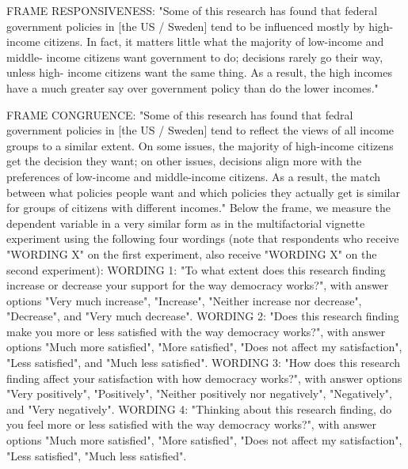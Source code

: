\documentclass[12pt, letterpaper]{article}
\begin{document}
\begin{spacing}{1.5}
FRAME RESPONSIVENESS: "Some of this research has found that federal government policies in [the US / Sweden] tend to be influenced mostly by high- income citizens. In fact, it matters little what the majority of low-income and middle- income citizens want government to do; decisions rarely go their way, unless high- income citizens want the same thing. As a result, the high incomes have a much greater say over government policy than do the lower incomes."

FRAME CONGRUENCE: "Some of this research has found that fedral government policies in [the US / Sweden] tend to reflect the views of all income groups to a similar extent. On some issues, the majority of high-income citizens get the decision they want; on other issues, decisions align more with the preferences of low-income and middle-income citizens. As a result, the match between what policies people want and which policies they actually get is similar for groups of citizens with different incomes."
Below the frame, we measure the dependent variable in a very similar form as in the multifactorial vignette experiment using the following four wordings (note that respondents who receive "WORDING X" on the first experiment, also receive "WORDING X" on the second experiment):
WORDING 1: "To what extent does this research finding increase or decrease your support for the way democracy works?", with answer options "Very much increase", "Increase", "Neither increase nor decrease", "Decrease", and "Very much decrease".
WORDING 2: "Does this research finding make you more or less satisfied with the way democracy works?", with answer options "Much more satisfied", "More satisfied", "Does not affect my satisfaction", "Less satisfied", and "Much less satisfied".
WORDING 3: "How does this research finding affect your satisfaction with how democracy works?", with answer options "Very positively", "Positively", "Neither positively nor negatively", "Negatively", and "Very negatively".
WORDING 4: "Thinking about this research finding, do you feel more or less satisfied with the way democracy works?", with answer options "Much more satisfied", "More satisfied", "Does not affect my satisfaction", "Less satisfied", "Much less satisfied".


\end{spacing}
\end{document}
